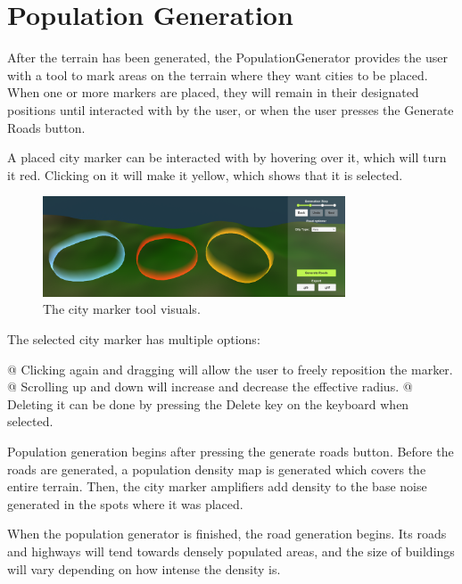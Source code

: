 \section{Population Generation}

After the terrain has been generated, the PopulationGenerator provides the user with a tool to mark areas on the terrain where they want cities to be placed. 
When one or more markers are placed, they will remain in their designated positions until interacted with by the user, or when the user presses the Generate Roads button.

A placed city marker can be interacted with by hovering over it, which will turn it red.
Clicking on it will make it yellow, which shows that it is selected. 

\begin{figure}[h!]
  \centering

  \includegraphics[width=0.8\textwidth]{figure/citymarkers.png}
  \caption{The city marker tool visuals. }

  \label{fig:citymarkers}
\end{figure}

The selected city marker has multiple options:
\begin{easylist}
  @ Clicking again and dragging will allow the user to freely reposition the marker.
  @ Scrolling up and down will increase and decrease the effective radius.
  @ Deleting it can be done by pressing the Delete key on the keyboard when selected.
\end{easylist}


Population generation begins after pressing the generate roads button.
Before the roads are generated, a population density map is generated which covers the entire terrain.
Then, the city marker amplifiers add density to the base noise generated in the spots where it was placed.

When the population generator is finished, the road generation begins.
Its roads and highways will tend towards densely populated areas, and the size of buildings will vary depending on how intense the density is.
